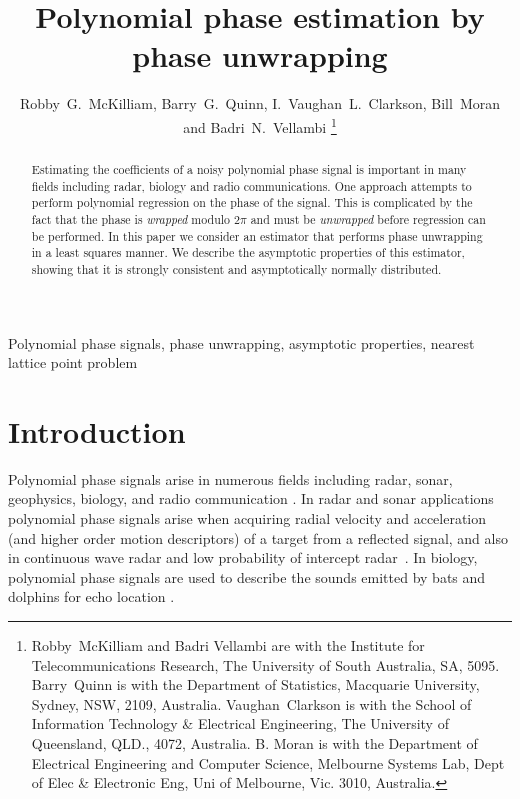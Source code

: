 \documentclass[journal]{IEEEtran}
\title{Polynomial phase estimation by phase unwrapping}
\author{Robby~G.~McKilliam, Barry~G.~Quinn, I.~Vaughan~L.~Clarkson, Bill~Moran and Badri~N.~Vellambi%
    \thanks{%
Robby~McKilliam and Badri Vellambi are with the Institute for Telecommunications Research, The University of South Australia, SA, 5095.  Barry~Quinn is with the Department of Statistics, Macquarie University, Sydney, NSW, 2109, Australia.   Vaughan~Clarkson is with the School of Information Technology \& Electrical Engineering, The University of Queensland, QLD., 4072, Australia.  B. Moran is with the Department of Electrical Engineering and Computer
Science, Melbourne Systems Lab, Dept of Elec \& Electronic Eng, Uni of Melbourne, Vic. 3010, Australia.}}
\begin{document}
 
\maketitle

\begin{abstract}
Estimating the coefficients of a noisy polynomial phase signal is important in many fields including radar, biology and radio communications. One approach attempts to perform polynomial regression on the phase of the signal.  This is complicated by the fact that the phase is \emph{wrapped} modulo $2\pi$ and must be \emph{unwrapped} before regression can be performed. %
In this paper we consider an estimator that performs phase unwrapping in a least squares manner.  We describe the asymptotic properties of this estimator, showing that it is strongly consistent and asymptotically normally distributed. %
\end{abstract}

\begin{keywords}
Polynomial phase signals, phase unwrapping, asymptotic properties, nearest lattice point problem
\end{keywords}
 
%

\section{Introduction} \label{intro}

Polynomial phase signals arise in numerous fields including radar, sonar, geophysics, biology, and radio communication \cite{Angeby_estimating_2000}. In radar and sonar applications polynomial phase signals arise when acquiring radial velocity and acceleration (and higher order motion descriptors) of a target from a reflected signal, and also in continuous wave radar and low probability of intercept radar~\cite{Levanon_Radar_signals_2004}.  In biology, polynomial phase signals are used to describe the sounds emitted by bats and dolphins for echo location \citep{Suga_1975_bats_echolocation, Moss_2005echolocation}.  
\end{document}

